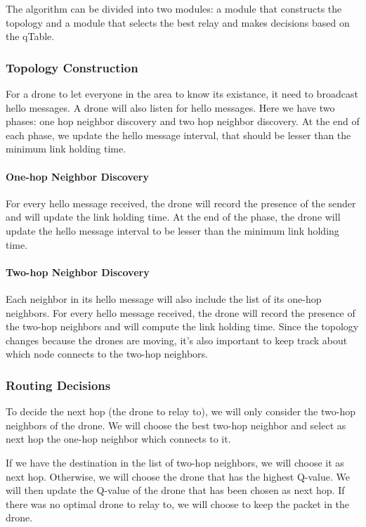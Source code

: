 The algorithm can be divided into two modules: a module that constructs the topology and a module that selects the best relay and makes decisions based on the qTable.

\subsubsection{Topology Construction}

For a drone to let everyone in the area to know its existance, it need to broadcast hello messages.
A drone will also listen for hello messages.
Here we have two phases: one hop neighbor discovery and two hop neighbor discovery.
At the end of each phase, we update the hello message interval, that should be lesser than
the minimum link holding time.

\paragraph{One-hop Neighbor Discovery}
For every hello message received, the drone will record the presence of the sender and
will update the link holding time. At the end of the phase, the drone will update the
hello message interval to be lesser than the minimum link holding time.

\paragraph{Two-hop Neighbor Discovery}
Each neighbor in its hello message will also include the list of its one-hop neighbors.
For every hello message received, the drone will record the presence of the two-hop neighbors and will compute the link holding time.
Since the topology changes because the drones are moving, it's also important to keep track about which node connects to the two-hop neighbors.

\subsubsection{Routing Decisions}
To decide the next hop (the drone to relay to), we will only consider the two-hop neighbors of the drone. %
We will choose the best two-hop neighbor and select as next hop the one-hop neighbor which connects to it.

If we have the destination in the list of two-hop neighbors, we will choose it as next hop.
Otherwise, we will choose the drone that has the highest Q-value.
We will then update the Q-value of the drone that has been chosen as next hop.
If there was no optimal drone to relay to, we will choose to keep the packet in the drone.




